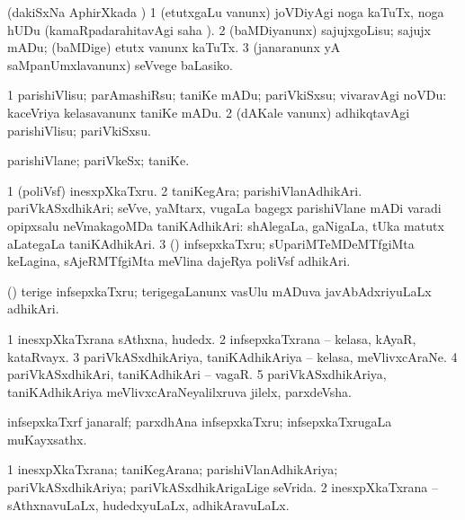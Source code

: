 \bentry
{}
\gl{\kirx}
\bmng
(dakiSxNa AphirXkada \parx) 
\bnum
\num{1} (etutxgaLu \mo vanunx) joVDiyAgi noga kaTuTx, noga hUDu (kamaRpadarahitavAgi saha \parx). 
\num{2} (baMDiyanunx) sajujxgoLisu; sajujx mADu; (baMDige) etutx \mo vanunx kaTuTx. 
\num{3} (janaranunx yA saMpanUmxlavanunx) seVvege baLasiko. 
\enum
\emng
\eentry

\bentry
{}
\gl{\sakirx}
\bmng
\bnum
\num{1} parishiVlisu; parAmashiRsu; taniKe mADu; pariVkiSxsu; vivaravAgi noVDu:  kaceVriya kelasavanunx taniKe mADu. 
\num{2} (dAKale \mo vanunx) adhikqtavAgi parishiVlisu; pariVkiSxsu. 
\enum
\emng
\eentry

\bentry
{}
\gl{\nA}
\bmng
parishiVlane; pariVkeSx; taniKe. 
\emng
\eentry

\bentry
{}
\gl{\nA}
\bmng
\bnum
\num{1} (poliVsf) inesxpXkaTxru. 
\num{2} taniKegAra; parishiVlanAdhikAri. pariVkASxdhikAri; seVve, yaMtarx, \mo vugaLa bagegx parishiVlane mADi varadi opipxsalu neVmakagoMDa taniKAdhikAri:  shAlegaLa, gaNigaLa, tUka matutx aLategaLa taniKAdhikAri. 
\num{3} (\birx) infsepxkaTxru; sUpariMTeMDeMTfgiMta keLagina, sAjeRMTfgiMta meVlina dajeRya poliVsf adhikAri. 
\enum
\emng

\noindent
\gl{\pagu}
\bmng
{} (\birx) terige infsepxkaTxru; terigegaLanunx vasUlu mADuva javAbAdxriyuLaLx adhikAri. 
\emng
\eentry

\bentry
{}
\gl{\nA}
\bmng
\bnum
\num{1} inesxpXkaTxrana sAthxna, hudedx. 
\num{2} infsepxkaTxrana -- kelasa, kAyaR, kataRvayx. 
\num{3} pariVkASxdhikAriya, taniKAdhikAriya -- kelasa, meVlivxcAraNe. 
\num{4} pariVkASxdhikAri, taniKAdhikAri -- vagaR. 
\num{5} pariVkASxdhikAriya, taniKAdhikAriya meVlivxcAraNeyalilxruva jilelx, parxdeVsha. 
\enum
\emng
\eentry

\bentry
{}
\gl{\nA}
\bmng
infsepxkaTxrf janaralf; parxdhAna infsepxkaTxru; infsepxkaTxrugaLa muKayxsathx. 
\emng
\eentry

\bentry
{}
\gl{\gu}
\bmng
\bnum
\num{1} inesxpXkaTxrana; taniKegArana; parishiVlanAdhikAriya; pariVkASxdhikAriya; pariVkASxdhikArigaLige seVrida. 
\num{2} inesxpXkaTxrana -- sAthxnavuLaLx, hudedxyuLaLx, adhikAravuLaLx. 
\enum
\emng
\eentry

